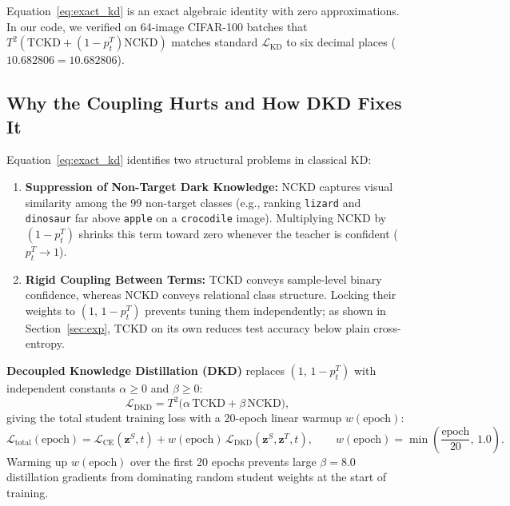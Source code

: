 \documentclass[11pt]{article}
\begin{document}
Equation~\eqref{eq:exact_kd} is an exact algebraic identity with zero approximations. In our code, we verified on 64-image CIFAR-100 batches that \(T^2(\mathrm{TCKD} + (1 - p_t^T)\mathrm{NCKD})\) matches standard \(\mathcal{L}_{\mathrm{KD}}\) to six decimal places (\(10.682806 = 10.682806\)).

\subsection{Why the Coupling Hurts and How DKD Fixes It}

Equation~\eqref{eq:exact_kd} identifies two structural problems in classical KD:
\begin{enumerate}
    \item \textbf{Suppression of Non-Target Dark Knowledge:} \(\mathrm{NCKD}\) captures visual similarity among the 99 non-target classes (e.g., ranking \texttt{lizard} and \texttt{dinosaur} far above \texttt{apple} on a \texttt{crocodile} image). Multiplying \(\mathrm{NCKD}\) by \((1 - p_t^T)\) shrinks this term toward zero whenever the teacher is confident (\(p_t^T \to 1\)).
    \item \textbf{Rigid Coupling Between Terms:} \(\mathrm{TCKD}\) conveys sample-level binary confidence, whereas \(\mathrm{NCKD}\) conveys relational class structure. Locking their weights to \((1, \, 1 - p_t^T)\) prevents tuning them independently; as shown in Section~\ref{sec:exp}, \(\mathrm{TCKD}\) on its own reduces test accuracy below plain cross-entropy.
\end{enumerate}

\textbf{Decoupled Knowledge Distillation (DKD)} replaces \((1, \, 1 - p_t^T)\) with independent constants \(\alpha \ge 0\) and \(\beta \ge 0\):
\begin{equation}
\mathcal{L}_{\mathrm{DKD}} = T^2 \big(\alpha \, \mathrm{TCKD} + \beta \, \mathrm{NCKD}\big),
\label{eq:dkd_final}
\end{equation}
giving the total student training loss with a 20-epoch linear warmup \(w(\text{epoch})\):
\begin{equation}
\mathcal{L}_{\mathrm{total}}(\text{epoch}) = \mathcal{L}_{\mathrm{CE}}(\mathbf{z}^S, t) + w(\text{epoch}) \, \mathcal{L}_{\mathrm{DKD}}(\mathbf{z}^S, \mathbf{z}^T, t), \qquad w(\text{epoch}) = \min\!\left(\frac{\text{epoch}}{20}, \, 1.0\right).
\label{eq:total_loss}
\end{equation}
Warming up \(w(\text{epoch})\) over the first 20 epochs prevents large \(\beta = 8.0\) distillation gradients from dominating random student weights at the start of training.
\end{document}

